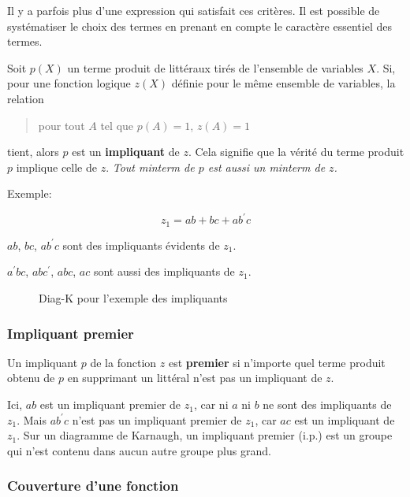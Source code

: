 \documentclass[11pt]{article}
\begin{document}
Il y a parfois plus d'une expression qui satisfait ces
critères. Il est possible de systématiser le choix des termes en
prenant en compte le caractère essentiel des termes.

Soit \(p(X)\) un terme produit de littéraux tirés de l'ensemble de
variables \(X\). Si, pour une fonction logique \(z(X)\) définie pour le
même ensemble de variables, la relation

\begin{quote}
pour tout \(A\) tel que \(p(A)=1\), \(z(A)=1\)
\end{quote}

tient, alors \(p\) est un \textbf{impliquant} de \(z\). Cela signifie que la
vérité du terme produit \(p\) implique celle de \(z\). \emph{Tout minterm de
\(p\) est aussi un minterm de \(z\).}

Exemple:

$$z_1 = ab + bc + a b^{\prime} c$$ 

\(a b\), \(b c\), \(a b^{\prime} c\) sont des impliquants évidents de \(z_1\).

\(a^{\prime} b c\), \(a b c^{\prime}\), \(a b c\), \(a c\) sont aussi des
impliquants de \(z_1\).

\begin{figure}[htbp]
\centering

\caption{\label{fig:org8ecc28c}Diag-K pour l'exemple des impliquants}
\end{figure}

\subsubsection{Impliquant premier}
\label{sec:org79b3278}

Un impliquant \(p\) de la fonction \(z\) est \textbf{premier} si n'importe quel
terme produit obtenu de \(p\) en supprimant un littéral n'est pas un
impliquant de \(z\).

Ici, \(a b\) est un impliquant premier de \(z_1\), car ni \(a\) ni \(b\) ne
sont des impliquants de \(z_1\). Mais \(a b^{\prime} c\) n'est pas un
impliquant premier de \(z_1\), car \(a c\) est un impliquant de \(z_1\).
Sur un diagramme de Karnaugh, un impliquant premier (i.p.) est un
groupe qui n'est contenu dans aucun autre groupe plus grand.

\subsubsection{Couverture d'une fonction}
\label{sec:org755fb5f}
\end{document}
